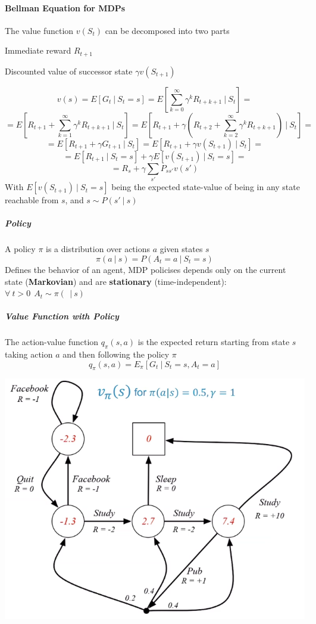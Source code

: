 \documentclass[10pt]{report}
\begin{document}
\paragraph{Bellman Equation for MDPs} The value function $v(S_t)$ can be decomposed into two parts
\begin{list}{}{}
	\item Immediate reward $R_{t+1}$
	\item Discounted value of successor state $\gamma v(S_{t+1})$
\end{list}
$$v(s)=E[G_t\:|\:S_t=s] = E\left[\sum_{k=0}^\infty\gamma^kR_{t+k+1}\:|\:S_t\right]=$$
$$= E\left[R_{t+1}+\sum_{k=1}^\infty\gamma^k R_{t+k+1}\:|\:S_t\right]= E\left[R_{t+1}+\gamma\left(R_{t+2}+\sum_{k=2}^\infty\gamma^k R_{t+k+1}\right)\:|\:S_t\right]=$$
$$= E[R_{t+1}+\gamma G_{t+1}\:|\:S_t] = E[R_{t+1}+\gamma v(S_{t+1})\:|\:S_t] =$$
$$= E[R_{t+1}\:|\:S_t=s] + \gamma E[v(S_{t+1})\:|\:S_t=s]=$$
$$=R_s+\gamma\sum_{s'}P_{ss'}v(s')$$
With $E[v(S_{t+1})\:|\:S_t=s]$ being the expected state-value of being in any state reachable from $s$, and $s\sim P(s'\:|\:s)$
\subparagraph{Policy} A policy $\pi$ is a distribution over actions $a$ given states $s$ $$\pi(a\:|\:s) = P(A_t=a\:|\: S_t=s)$$
Defines the behavior of an agent, MDP policises depends only on the current state (\textbf{Markovian}) and are \textbf{stationary} (time-independent): $\forall\:t>0\:\:A_t\sim \pi(\:\:|\:s)$
\subparagraph{Value Function with Policy} The action-value function $q_\pi(s,a)$ is the expected return starting from state $s$ taking action $a$ and then following the policy $\pi$
$$q_\pi(s,a) = E_\pi[G_t\:|\:S_t=s, A_t=a]$$
\begin{center}
	\includegraphics[scale=0.5]{161.png}
\end{center}
\end{document}
